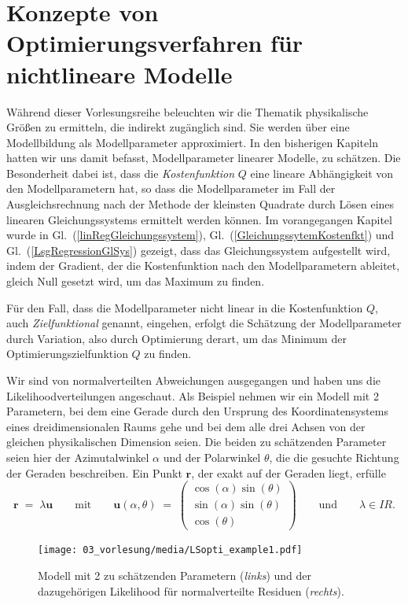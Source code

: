 \section{Konzepte von Optimierungsverfahren für nichtlineare Modelle}
Während dieser Vorlesungsreihe beleuchten wir die Thematik physikalische Größen zu ermitteln, die
indirekt zugänglich sind. Sie werden über eine Modellbildung als Modellparameter approximiert.
In den bisherigen Kapiteln hatten wir uns damit befasst, Modellparameter linearer Modelle, zu schätzen.
Die Besonderheit dabei ist, dass die \textsl{Kostenfunktion} $Q$ eine lineare Abhängigkeit von den
Modellparametern hat, so dass die Modellparameter
im Fall der Ausgleichsrechnung nach der Methode der kleinsten Quadrate durch Lösen eines
linearen Gleichungssystems ermittelt werden können.
Im vorangegangen Kapitel wurde in Gl.~(\ref{linRegGleichungssystem}), Gl.~(\ref{GleichungssytemKostenfkt})
 und Gl.~(\ref{LsgRegressionGlSys}) gezeigt, dass das Gleichungssystem
aufgestellt wird, indem der Gradient, der die Kostenfunktion nach den Modellparametern ableitet, gleich Null
gesetzt wird, um das Maximum zu finden.

Für den Fall, dass die Modellparameter nicht linear in die Kostenfunktion $Q$,
auch \textsl{Zielfunktional} genannt, eingehen,
erfolgt die Schätzung der Modellparameter durch Variation, also durch Optimierung derart, um
das Minimum der Optimierungszielfunktion $Q$ zu finden.

Wir sind von normalverteilten Abweichungen ausgegangen und haben uns
die Likelihoodverteilungen angeschaut. Als Beispiel nehmen wir ein Modell mit 2 Parametern, bei
dem eine Gerade durch den Ursprung des Koordinatensystems eines dreidimensionalen
Raums gehe und bei dem alle drei Achsen von der gleichen physikalischen Dimension seien.
Die beiden zu schätzenden Parameter seien hier der Azimutalwinkel $\alpha$ und der
Polarwinkel $\theta$, die die gesuchte Richtung der Geraden beschreiben.
Ein Punkt $\mathbf{r}$, der exakt auf der Geraden liegt, erfülle
\begin{equation}
\mathbf{r} \; = \; \lambda \mathbf{u} \qquad \mathrm{mit} \qquad
\mathbf{u}(\alpha,\theta) \; = \; \left(\begin{array}{c}
\cos(\alpha) \sin(\theta)\\
\sin(\alpha) \sin(\theta)\\
\cos(\theta) \end{array}\right) \qquad \mathrm{und} \qquad \lambda \in I \!\! R.
\end{equation}
\begin{figure}
\begin{center}
\texttt{[image: 03\_vorlesung/media/LSopti\_example1.pdf]}
\end{center}
\caption{Modell mit 2 zu schätzenden Parametern (\textsl{links}) und der dazugehörigen
Likelihood für normalverteilte Residuen (\textsl{rechts}).\label{LSoptiExample1}}
\end{figure}

